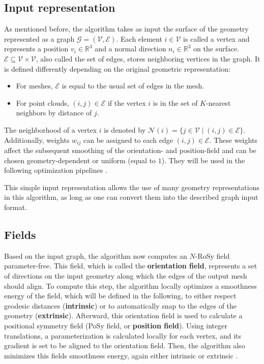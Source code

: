 \documentclass{ACGSeminar}
\begin{document}
\subsection{Input representation}
As mentioned before, the algorithm takes as input the surface of the geometry represented as a graph $\mathcal{G} = (\mathcal{V}, \mathcal{E})$. Each element $i \in \mathcal{V}$ is called a vertex and represents a position $v_i \in \mathbb{R}^3$ and a normal direction $n_i \in \mathbb{R}^3$ on the surface. $\mathcal{E} \subseteq \mathcal{V} \times \mathcal{V}$, also called the set of edges, stores neighboring vertices in the graph. It is defined differently depending on the original geometric representation:
\begin{itemize}
	\item	For meshes, $\mathcal{E}$ is equal to the usual set of edges in the mesh.
	\item	For point clouds, $(i,j) \in \mathcal{E}$ if the vertex $i$ is in the set of $K$-nearest neighbors by distance of $j$.
\end{itemize}
The neighborhood of a vertex $i$ is denoted by $\mathcal{N}(i) = \{j \in \mathcal{V} \mid (i,j) \in \mathcal{E}\}$. Additionally, weights $w_{ij}$ can be assigned to each edge $(i,j) \in \mathcal{E}$. These weights affect the subsequent smoothing of the orientation- and position-field and can be chosen geometry-dependent or uniform (equal to $1$). They will be used in the following optimization pipelines \cite{jakob2015instant}.\bigskip

This simple input representation allows the use of many geometry representations in this algorithm, as long as one can convert them into the described graph input format.

\subsection{Fields}
Based on the input graph, the algorithm now computes an $N$-RoSy field parameter-free. This field, which is called the \textbf{orientation field}, represents a set of directions on the input geometry along which the edges of the output mesh should align. To compute this step, the algorithm locally optimizes a smoothness energy of the field, which will be defined in the following, to either respect geodesic distances (\textbf{intrinsic}) or to automatically snap to the edges of the geometry (\textbf{extrinsic}). Afterward, this orientation field is used to calculate a positional symmetry field (PoSy field, or \textbf{position field}). Using integer translations, a parameterization is calculated locally for each vertex, and its gradient is set to be aligned to the orientation field. Then, the algorithm also minimizes this fields smoothness energy, again either intrinsic or extrinsic \cite{jakob2015instant}.\bigskip
\end{document}
